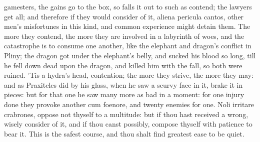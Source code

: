 {gamesters, the gains go to the box, so falls it out to such as contend;
the lawyers get all; and therefore if they would consider of it, aliena
pericula cantos, other men's misfortunes in this kind, and common
experience might detain them. The more they contend, the more
they are involved in a labyrinth of woes, and the catastrophe is to
consume one another, like the elephant and dragon's conflict in Pliny;
the dragon got under the elephant's belly, and sucked his blood
so long, till he fell down dead upon the dragon, and killed him with
the fall, so both were ruined. 'Tis a hydra's head, contention; the
more they strive, the more they may: and as Praxiteles did by his
glass, when he saw a scurvy face in it, brake it in pieces: but for
that one he saw many more as bad in a moment: for one injury done they
provoke another cum foenore, and twenty enemies for one. Noli irritare
crabrones, oppose not thyself to a multitude: but if thou hast received
a wrong, wisely consider of it, and if thou canst possibly, compose
thyself with patience to bear it. This is the safest course, and thou
shalt find greatest ease to be quiet.

}
